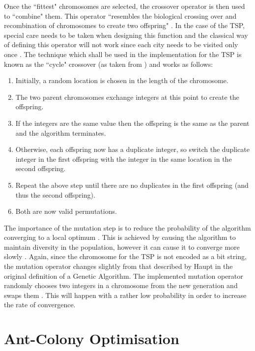 \documentclass[11pt,a4paper,final]{article}
\begin{document}
	\par Once the ``fittest" chromosomes are selected, the crossover operator is then used to ``combine" them. This operator ``resembles the biological crossing over and recombination of chromosomes to create two offspring" \cite{GeneticAlgorithms}. In the case of the TSP, special care needs to be taken when designing this function and the classical way of defining this operator will not work since each city needs to be visited only once \cite{Haupt}. The technique which shall be used in the implementation for the TSP is known as the ``cycle" crossover (as taken from \cite{GeneticAlgorithms}) and works as follows:
	\begin{enumerate}
		\item Initially, a random location is chosen in the length of the chromosome.
		\item The two parent chromosomes exchange integers at this point to create the offspring.
		\item If the integers are the same value then the offspring is the same as the parent and the algorithm terminates.
		\item Otherwise, each offspring now has a duplicate integer, so switch the duplicate integer in the first offspring with the integer in the same location in the second offspring.
		\item Repeat the above step until there are no duplicates in the first offspring (and thus the second offspring).
		\item Both are now valid permutations.
	\end{enumerate}
	\par The importance of the mutation step is to reduce the probability of the algorithm converging to a local optimum \cite{Haupt}. This is achieved by causing the algorithm to maintain diversity in the population, however it can cause it to converge more slowly \cite{GeneticAlgorithms}. Again, since the chromosome for the TSP is not encoded as a bit string, the mutation operator changes slightly from that described by Haupt in the original definition of a Genetic Algorithm. The implemented mutation operator randomly chooses two integers in a chromosome from the new generation and swaps them \cite{GeneticAlgorithms}. This will happen with a rather low probability in order to increase the rate of convergence.
	
	\section{Ant-Colony Optimisation}
	\label{ACO}
\end{document}
